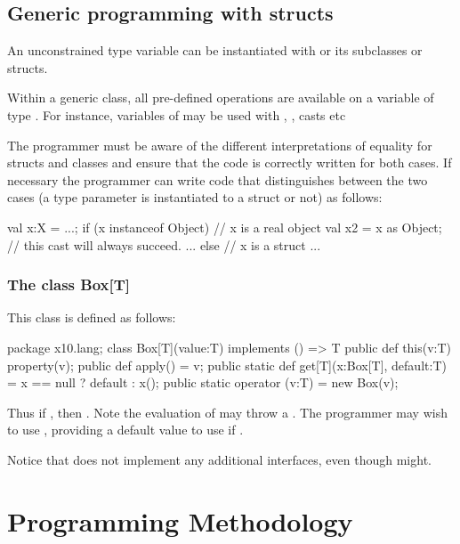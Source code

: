   
\subsection{Generic programming with structs}

An unconstrained type variable  can be instantiated with  or
its subclasses or structs.

Within a generic class, all pre-defined operations
are available on a variable of type
. For instance, variables of  may be used with \Xcd{==, !=},
, casts etc

The programmer must be aware of the different interpretations of
equality for structs and classes and ensure that the code is correctly
written for both cases. If necessary the programmer can write code
that distinguishes between the two cases (a type parameter  is
instantiated to a struct or not) as follows:


\begin{xten}
val x:X = ...;
if (x instanceof Object) { // x is a real object
   val x2 = x as Object; // this cast will always succeed.
   ...
} else { // x is a struct
   ...
}
\end{xten}
 
  
\subsubsection{The class Box[T]}

This class is defined as follows: 

\begin{xten}
package x10.lang;
class Box[T](value:T) implements () => T {
   public def this(v:T) { property(v);}
   public def apply() = v;
   public static def get[T](x:Box[T], default:T) =
              x == null ? default : x();
   public static operator (v:T) = new Box(v);
}
\end{xten}


Thus if , then . Note the evaluation of  may
throw a . The programmer may wish to use
, providing a default value to use if .

Notice that  does not implement any additional interfaces, even
though  might.
  
\section{Programming Methodology}

